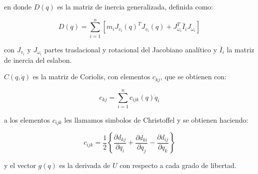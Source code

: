 \begin{multicols*}{3}
        en donde $D(q)$ es la matriz de inercia generalizada, definida como:

        \begin{equation}
            D(q) = \sum_{i=1}^n \left[ m_i J_{v_i}(q)^T J_{v_i}(q) + J_{\omega_i}^T \bar{I}_i J_{\omega_i} \right]
        \end{equation}

        con $J_{v_i}$ y $J_{\omega_i}$ partes traslacional y rotacional del Jacobiano analítico y $\bar{I}_i$ la matriz de inercia del eslabon.

        $C(q, \dot{q})$ es la matriz de Coriolis, con elementos $c_{kj}$, que se obtienen con:

        \begin{equation}
            c_{kj} = \sum_{i=1}^n c_{ijk}(q) \dot{q}_i
        \end{equation}

        a los elementos $c_{ijk}$ les llamamos simbolos de Christoffel y se obtienen haciendo:

        \begin{equation}
            c_{ijk} = \frac{1}{2} \left\{ \frac{\partial d_{kj}}{\partial q_i} + \frac{\partial d_{ki}}{\partial q_j} - \frac{\partial d_{ij}}{\partial q_k} \right\}
        \end{equation}

        y el vector $g(q)$ es la derivada de $U$ con respecto a cada grado de libertad.

\end{multicols*}

